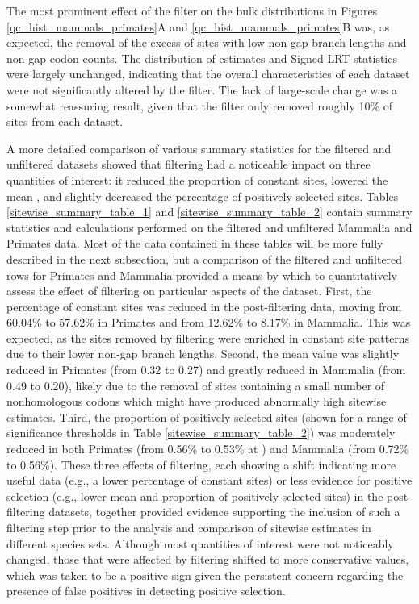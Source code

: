 The most prominent effect of the filter on the bulk distributions in
Figures \ref{qc_hist_mammals_primates}A and
\ref{qc_hist_mammals_primates}B was, as expected, the removal of the
excess of sites with low non-gap branch lengths and non-gap codon
counts. The distribution of \omg estimates and Signed LRT statistics
were largely unchanged, indicating that the overall characteristics of
each dataset were not significantly altered by the filter. The lack of
large-scale change was a somewhat reassuring result, given that the
filter only removed roughly 10\% of sites from each dataset.

A more detailed comparison of various summary statistics for the
filtered and unfiltered datasets showed that filtering had a
noticeable impact on three quantities of interest: it reduced the
proportion of constant sites, lowered the mean \omg, and slightly
decreased the percentage of positively-selected sites. Tables
\ref{sitewise_summary_table_1} and \ref{sitewise_summary_table_2}
contain summary statistics and calculations performed on the filtered
and unfiltered Mammalia and Primates data. Most of the data contained
in these tables will be more fully described in the next subsection,
but a comparison of the filtered and unfiltered rows for Primates and
Mammalia provided a means by which to quantitatively assess the effect
of filtering on particular aspects of the dataset. First, the
percentage of constant sites was reduced in the post-filtering data,
moving from 60.04\% to 57.62\% in Primates and from 12.62\% to 8.17\%
in Mammalia. This was expected, as the sites removed by filtering were
enriched in constant site patterns due to their lower non-gap branch
lengths. Second, the mean \omg value was slightly reduced in Primates
(from 0.32 to 0.27) and greatly reduced in Mammalia (from 0.49 to
0.20), likely due to the removal of sites containing a small number of
nonhomologous codons which might have produced abnormally high
sitewise \ml \omg estimates. Third, the proportion of
positively-selected sites (shown for a range of significance
thresholds in Table \ref{sitewise_summary_table_2}) was moderately
reduced in both Primates (from 0.56\% to 0.53\% at ) and
Mammalia (from 0.72\% to 0.56\%). These three effects of filtering,
each showing a shift indicating more useful data (e.g., a lower
percentage of constant sites) or less evidence for positive selection
(e.g., lower mean \omg and proportion of positively-selected sites) in
the post-filtering datasets, together provided evidence supporting the
inclusion of such a filtering step prior to the analysis and
comparison of sitewise estimates in different species sets. Although
most quantities of interest were not noticeably changed, those that
were affected by filtering shifted to more conservative values, which
was taken to be a positive sign given the persistent concern regarding
the presence of false positives in detecting positive selection.

